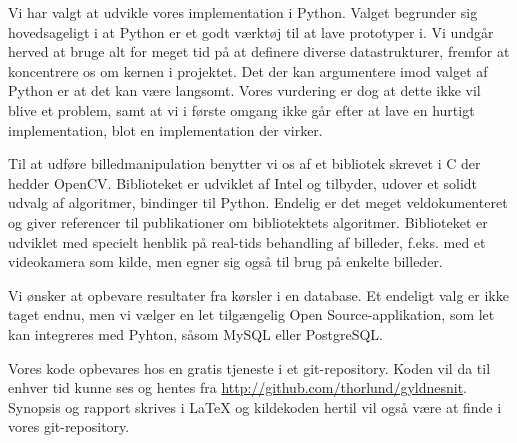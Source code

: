 Vi har valgt at udvikle vores implementation i Python. Valget begrunder
sig hovedsageligt i at Python er et godt værktøj til at lave prototyper
i. Vi undgår herved at bruge alt for meget tid på at definere diverse
datastrukturer, fremfor at koncentrere os om kernen i projektet. Det der
kan argumentere imod valget af Python er at det kan være langsomt. Vores
vurdering er dog at dette ikke vil blive et problem, samt at vi i første
omgang ikke går efter at lave en hurtigt implementation, blot en
implementation der virker.

Til at udføre billedmanipulation benytter vi os af et bibliotek skrevet i C der
hedder OpenCV. Biblioteket er udviklet af Intel og tilbyder, udover et solidt
udvalg af algoritmer, bindinger til Python. Endelig er det meget
veldokumenteret og giver referencer til publikationer om bibliotektets
algoritmer. Biblioteket er udviklet med specielt henblik på real-tids
behandling af billeder, f.eks. med et videokamera som kilde, men egner sig også
til brug på enkelte billeder.

Vi ønsker at opbevare resultater fra kørsler i en database. Et endeligt
valg er ikke taget endnu, men vi vælger en let tilgængelig Open
Source-applikation, som let kan integreres med Pyhton, såsom MySQL eller
PostgreSQL.

Vores kode opbevares hos en gratis tjeneste i et git-repository. Koden
vil da til enhver tid kunne ses og hentes fra
\href{http://github.com/thorlund/gyldnesnit}{http://github.com/thorlund/gyldnesnit}.
Synopsis og rapport skrives i \LaTeX{} og kildekoden hertil vil også være
at finde i vores git-repository.

